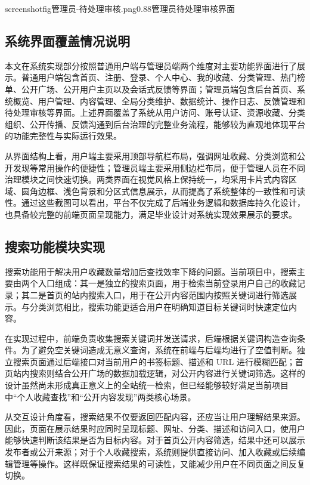 \documentclass[12pt,a4paper]{ctexart}
\begin{document}
screenshotfig{管理员-待处理审核.png}{0.88}{管理员待处理审核界面}


\subsection{系统界面覆盖情况说明}
本文在系统实现部分按照普通用户端与管理员端两个维度对主要功能界面进行了展示。普通用户端包含首页、注册、登录、个人中心、我的收藏、分类管理、热门榜单、公开广场、公开用户主页以及会话式反馈等界面；管理员端包含后台首页、系统概览、用户管理、内容管理、全局分类维护、数据统计、操作日志、反馈管理和待处理审核等界面。上述界面覆盖了系统从用户访问、账号认证、资源收藏、分类组织、公开传播、反馈沟通到后台治理的完整业务流程，能够较为直观地体现平台的功能完整性与实际运行效果。

从界面结构上看，用户端主要采用顶部导航栏布局，强调网址收藏、分类浏览和公开发现等常用操作的便捷性；管理员端主要采用侧边栏布局，便于管理人员在不同治理模块之间快速切换。两类界面在视觉风格上保持统一，均采用卡片式内容区域、圆角边框、浅色背景和分区式信息展示，从而提高了系统整体的一致性和可读性。通过这些截图可以看出，平台不仅完成了后端业务逻辑和数据库持久化设计，也具备较完整的前端页面呈现能力，满足毕业设计对系统实现效果展示的要求。



\subsection{搜索功能模块实现}
搜索功能用于解决用户收藏数量增加后查找效率下降的问题。当前项目中，搜索主要由两个入口组成：其一是独立的搜索页面，用于检索当前登录用户自己的收藏记录；其二是首页的站内搜索入口，用于在公开内容范围内按照关键词进行筛选展示。与分类浏览相比，搜索功能更适合用户在明确知道目标关键词时快速定位内容。

在实现过程中，前端负责收集搜索关键词并发送请求，后端根据关键词构造查询条件。为了避免空关键词造成无意义查询，系统在前端与后端均进行了空值判断。独立搜索页面通过后端接口对当前用户的书签标题、描述和 URL 进行模糊匹配；首页站内搜索则结合公开广场的数据加载逻辑，对公开内容进行关键词筛选。这样的设计虽然尚未形成真正意义上的全站统一检索，但已经能够较好满足当前项目中“个人收藏查找”和“公开内容发现”两类核心场景。

从交互设计角度看，搜索结果不仅要返回匹配内容，还应当让用户理解结果来源。因此，页面在展示结果时应同时呈现标题、网址、分类、描述和访问入口，使用户能够快速判断该结果是否为目标内容。对于首页公开内容筛选，结果中还可以展示发布者或公开来源；对于个人收藏搜索，系统则提供直接访问、加入收藏或后续编辑管理等操作。这样既保证搜索结果的可读性，又能减少用户在不同页面之间反复切换。
\end{document}
